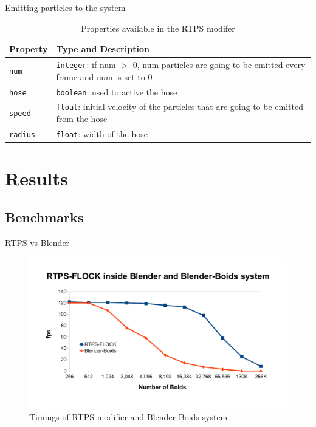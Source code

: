 \documentclass[red]{beamer}
\begin{document}
\begin{frame}{Emitting particles to the system}
	\begin{table}[htdp]
	\caption{Properties available in the RTPS modifer}
	\begin{center}
	\begin{tabular}{|p{2cm}|p{6cm}|}
	\hline 
	\textbf{Property} & \textbf{Type and Description} \\\hline 
	\texttt{num} 	& \texttt{integer}: if num $>$ 0, num particles are going to be emitted every frame and num is set to 0	\\\hline 
	\texttt{hose}	& \texttt{boolean}: used to active the hose	\\\hline
	\texttt{speed}	& \texttt{float}: initial velocity of the particles that are going to be emitted from the hose	\\\hline
	\texttt{radius}	& \texttt{float}: width of the hose	\\
	\hline 
	\end{tabular}
	\end{center}
	\end{table}
\end{frame}


\section{Results}

\subsection{Benchmarks}

\begin{frame}{RTPS vs Blender}
	\begin{figure}[htbp]
	\begin{center}
	\includegraphics[scale=0.30]{../figures/benchmarks.pdf}
	\caption{Timings of RTPS modifier and Blender Boids system}
	\label{plot}
	\end{center}
	\end{figure}
\end{frame}
\end{document}
